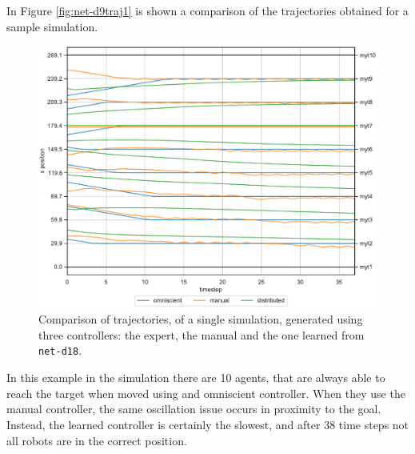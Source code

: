 In Figure \ref{fig:net-d9traj1} is shown a comparison of the trajectories obtained 
for a sample simulation.
\begin{figure}[!htb]
	\centering
	\includegraphics[width=.65\textwidth]{contents/images/net-d18/animation-distributed}%
	\caption[Evaluation of the trajectories obtained with variable 
	agents.]{Comparison of trajectories, of a single simulation, generated using 
		three controllers: the expert, the manual and the one learned from 
		\texttt{net-d18}.}
	\label{fig:net-d18traj1}
\end{figure}  
In this example in the simulation there are 10 agents, that are always able to 
reach the target when moved using and omniscient controller.
When they use the manual controller, the same oscillation issue occurs in 
proximity  to the goal. Instead, the learned controller is certainly the slowest, and 
after 38 time steps not all robots are in the correct position.


